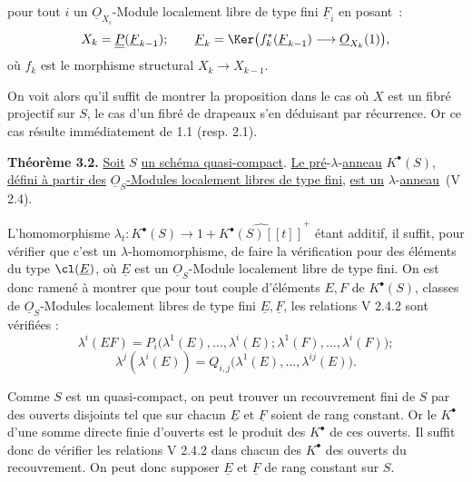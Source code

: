 
pour tout \(i\) un \(\underline{O}_{X_i}\)-Module localement libre de type fini \(\underline{F}_i\) en posant~:
\[
  X_k=\underline{\underline{P}}(\underline{F}_{k-1});\qquad
  \underline{F}_k=\Ker\bigl(f_k^*(\underline{F}_{k-1})\longrightarrow \underline{O}_{X_k}(1)\bigr),
\]
où \(f_k\) est le morphisme structural \(X_k\to X_{k-1}\).

On voit alors qu'il suffit de montrer la proposition dans le cas où \(X\) est un fibré projectif sur \(S\), le cas d'un fibré de drapeaux s'en déduisant par récurrence. Or ce cas résulte immédiatement de 1.1 (resp. 2.1).

\textbf{Théorème 3.2.} \uline{Soit} \(S\) \uline{un schéma quasi-compact}. \uline{Le pré}-\(\lambda\)-\uline{anneau} \(K^{\bullet}(S)\), \uline{défini à partir des} \(\underline{O}_S\)\uline{-Modules localement libres de type fini}, \uline{est un} \(\lambda\)-\uline{anneau}~(V 2.4).

L'homomorphisme \(\lambda_t:K^{\bullet}(S)\longrightarrow 1+\widehat{K^{\bullet}(S)[[t]]}^{+}\) étant additif, il suffit, pour vérifier que c'est un \(\lambda\)-homomorphisme, de faire la vérification pour des éléments du type \(\cl(\underline{E})\), où \(\underline{E}\) est un \(\underline{O}_S\)-Module localement libre de type fini. On est donc ramené à montrer que pour tout couple d'éléments \(E,F\) de \(K^{\bullet}(S)\), classes de \(\underline{O}_S\)-Modules localement libres de type fini \(\underline{E},\underline{F}\), les relations V 2.4.2 sont vérifiées :
\[
  \lambda^i(EF)=P_i\bigl(\lambda^1(E),\ldots,\lambda^i(E);\lambda^1(F),\ldots,\lambda^i(F)\bigr);
\]
\[
  \lambda^j(\lambda^i(E))=Q_{i,j}\bigl(\lambda^1(E),\ldots,\lambda^{ij}(E)\bigr).
\]

Comme \(S\) est un quasi-compact, on peut trouver un recouvrement fini de \(S\) par des ouverts disjoints tel que sur chacun \(\underline{E}\) et \(\underline{F}\) soient de rang constant. Or le \(K^{\bullet}\) d'une somme directe finie d'ouverts est le produit des \(K^{\bullet}\) de ces ouverts. Il suffit donc de vérifier les relations V 2.4.2 dans chacun des \(K^{\bullet}\) des ouverts du recouvrement. On peut donc supposer \(\underline{E}\) et \(\underline{F}\) de rang constant sur \(S\).

